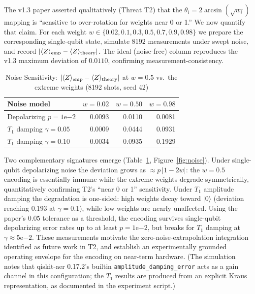 ﻿\documentclass[12pt,a4paper]{article}
\begin{document}
The v1.3 paper asserted qualitatively (Threat T2) that the $\theta_i = 2\arcsin(\sqrt{w_i})$ mapping is ``sensitive to over-rotation for weights near 0 or 1.'' We now quantify that claim. For each weight $w \in \{0.02, 0.1, 0.3, 0.5, 0.7, 0.9, 0.98\}$ we prepare the corresponding single-qubit state, simulate 8192 measurements under swept noise, and record $|\langle Z\rangle_{\rm emp} - \langle Z\rangle_{\rm theory}|$. The ideal (noise-free) column reproduces the v1.3 maximum deviation of $0.0110$, confirming measurement-consistency.

\begin{table}[H]
\centering
\caption{Noise Sensitivity: $|\langle Z\rangle_{\rm emp} - \langle Z\rangle_{\rm theory}|$ at $w = 0.5$ vs.\ the extreme weights (8192 shots, seed 42)}
\label{tab:noise}
\small
\begin{tabular}{@{}lrrr@{}}
\toprule
\textbf{Noise model} & \textbf{$w=0.02$} & \textbf{$w=0.50$} & \textbf{$w=0.98$} \\
\midrule
Depolarizing $p = 1\mathrm{e}{-2}$ & 0.0093 & 0.0110 & 0.0081 \\
$T_1$ damping $\gamma = 0.05$       & 0.0009 & 0.0444 & 0.0931 \\
$T_1$ damping $\gamma = 0.10$       & 0.0034 & 0.0935 & 0.1929 \\
\bottomrule
\end{tabular}
\end{table}

Two complementary signatures emerge (Table~\ref{tab:noise}, Figure~\ref{fig:noise}). Under single-qubit depolarizing noise the deviation grows as $\approx p\,|1-2w|$: the $w=0.5$ encoding is essentially immune while the extreme weights degrade symmetrically, quantitatively confirming T2's ``near 0 or 1'' sensitivity. Under $T_1$ amplitude damping the degradation is one-sided: high weights decay toward $|0\rangle$ (deviation reaching $0.193$ at $\gamma=0.1$), while low weights are nearly unaffected. Using the paper's $0.05$ tolerance as a threshold, the encoding survives single-qubit depolarizing error rates up to at least $p = 1\mathrm{e}{-2}$, but breaks for $T_1$ damping at $\gamma \approx 5\mathrm{e}{-2}$. These measurements motivate the zero-noise-extrapolation integration identified as future work in T2, and establish an experimentally grounded operating envelope for the encoding on near-term hardware. (The simulation notes that qiskit-aer 0.17.2's builtin \texttt{amplitude\_damping\_error} acts as a gain channel in this configuration; the $T_1$ results are produced from an explicit Kraus representation, as documented in the experiment script.)
\end{document}

